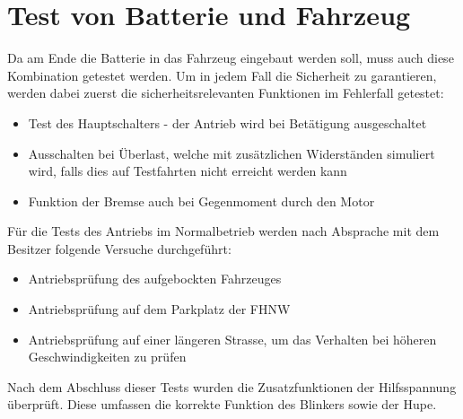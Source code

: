 \section{Test von Batterie und Fahrzeug}
Da am Ende die Batterie in das Fahrzeug eingebaut werden soll, muss auch diese Kombination getestet werden. Um in jedem Fall die Sicherheit zu garantieren, werden dabei zuerst die sicherheitsrelevanten Funktionen im Fehlerfall getestet: \begin{itemize}
	\item Test des Hauptschalters - der Antrieb wird bei Betätigung ausgeschaltet
	\item Ausschalten bei Überlast, welche mit zusätzlichen Widerständen simuliert wird, falls dies auf Testfahrten nicht erreicht werden kann
	\item Funktion der Bremse auch bei Gegenmoment durch den Motor
\end{itemize}

Für die Tests des Antriebs im Normalbetrieb werden nach Absprache mit dem Besitzer folgende Versuche durchgeführt: \begin{itemize}
	\item Antriebsprüfung des aufgebockten Fahrzeuges
	\item Antriebsprüfung auf dem Parkplatz der FHNW
	\item Antriebsprüfung auf einer längeren Strasse, um das Verhalten bei höheren Geschwindigkeiten zu prüfen
\end{itemize}

Nach dem Abschluss dieser Tests wurden die Zusatzfunktionen der Hilfsspannung überprüft. Diese umfassen die korrekte Funktion des Blinkers sowie der Hupe.

